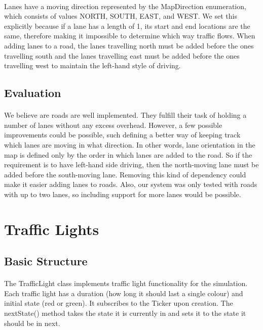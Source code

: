 \documentclass[a4paper,11pt,titlepage]{article}
\begin{document}
\paragraph{}
Lanes have a moving direction represented by the MapDirection enumeration, which consists of values NORTH, SOUTH, EAST, and WEST. We set this explicitly because if a lane has a length of 1, its start and end locations are the same, therefore making it impossible to determine which way traffic flows. When adding lanes to a road, the lanes travelling north must be added before the ones travelling south and the lanes travelling east must be added before the ones travelling west to maintain the left-hand style of driving.

\subsection{Evaluation}
\paragraph{}
We believe are roads are well implemented. They fulfill their task of holding a number of lanes without any excess overhead. However, a few possible improvements could be possible, such defining a better way of keeping track which lanes are moving in what direction. In other words, lane orientation in the map is defined only by the order in which lanes are added to the road. So if the requirement is to have left-hand side driving, then the north-moving lane must be added before the south-moving lane. Removing this kind of dependency could make it easier adding lanes to roads. Also, our system was only tested with roads with up to two lanes, so including support for more lanes would be possible.

\section{Traffic Lights}\label{trafficlights}
\subsection{Basic Structure}
\paragraph{}
The TrafficLight class implements traffic light functionality for the simulation. Each traffic light has a duration (how long it should last a single colour) and initial state (red or green). It subscribes to the Ticker upon creation. The nextState() method takes the state it is currently in and sets it to the state it should be in next.
\end{document}
